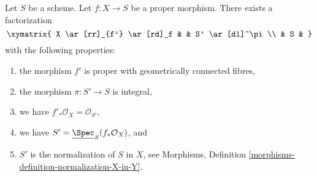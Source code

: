 \begin{theorem}
\label{theorem-stein-factorization-general}
Let $S$ be a scheme.
Let $f : X \to S$ be a proper morphism.
There exists a factorization
$$
\xymatrix{
X \ar[rr]_{f'} \ar[rd]_f & & S' \ar[dl]^\pi \\
& S &
}
$$
with the following properties:
\begin{enumerate}
\item the morphism $f'$ is proper with geometrically connected fibres,
\item the morphism $\pi : S' \to S$ is integral,
\item we have $f'_*\mathcal{O}_X = \mathcal{O}_{S'}$,
\item we have $S' = \underline{\Spec}_S(f_*\mathcal{O}_X)$, and
\item $S'$ is the normalization of $S$ in $X$, see
Morphisms, Definition \ref{morphisms-definition-normalization-X-in-Y}.
\end{enumerate}
\end{theorem}

